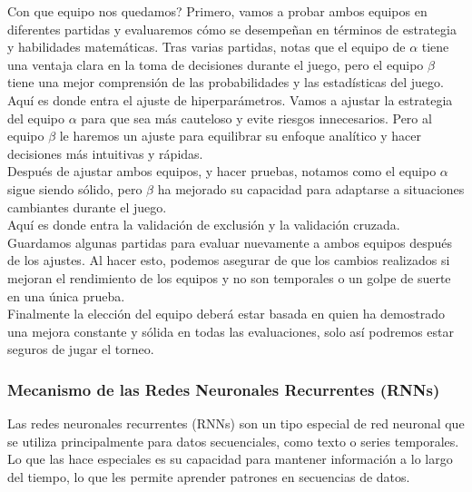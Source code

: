 Con que equipo nos quedamos? Primero, vamos a probar ambos equipos en diferentes partidas y 
evaluaremos cómo se desempeñan en términos de estrategia y habilidades matemáticas. Tras varias 
partidas, notas que el equipo de $\alpha$ tiene una ventaja clara en la toma de decisiones durante 
el juego, pero el equipo $\beta$ tiene una mejor comprensión de las probabilidades y las 
estadísticas del juego.\\

Aquí es donde entra el ajuste de hiperparámetros. Vamos a ajustar la estrategia del equipo 
$\alpha$ para que sea más cauteloso y evite riesgos innecesarios. Pero al equipo $\beta$ le 
haremos un ajuste para equilibrar su enfoque analítico y hacer decisiones más intuitivas y rápidas.\\ 

Después de ajustar ambos equipos, y hacer pruebas, notamos como el equipo $\alpha$ sigue siendo sólido, 
pero $\beta$ ha mejorado su capacidad para adaptarse a situaciones cambiantes durante el juego.\\ 

Aquí es donde entra la validación de exclusión y la validación cruzada. Guardamos algunas partidas 
para evaluar nuevamente a ambos equipos después de los ajustes. Al hacer esto, podemos asegurar de 
que los cambios realizados si mejoran el rendimiento de los equipos y no son temporales o un golpe 
de suerte en una única prueba.\\ 

Finalmente la elección del equipo deberá estar basada en quien ha demostrado una mejora constante y 
sólida en todas las evaluaciones, solo así podremos estar seguros de jugar el torneo.


\subsubsection*{Mecanismo de las Redes Neuronales Recurrentes (RNNs)}


Las redes neuronales recurrentes (RNNs) son un tipo especial de red neuronal que se utiliza 
principalmente para datos secuenciales, como texto o series temporales. Lo que las hace especiales 
es su capacidad para mantener información a lo largo del tiempo, lo que les permite aprender 
patrones en secuencias de datos.

